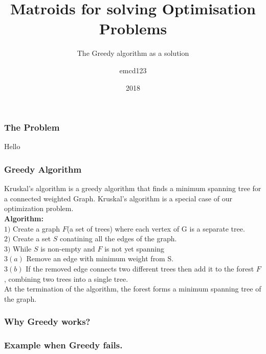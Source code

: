 \documentclass{beamer}
\title[Matroids] %
{Matroids for solving Optimisation Problems}
\subtitle{The Greedy algorithm as a solution}
\author{emcd123}
\institute{NUI Galway}
\date{2018}
\newcommand\Algorithm{%
  \textbf{Algorithm:}\\%
}
\begin{document}
 
\frame{\titlepage}
 
\begin{frame}
\frametitle{The Problem}
\begin{minipage}{.2\textwidth}
\end{minipage}
\hspace{4cm} \begin{minipage}{.2\textwidth}
Hello
\end{minipage}
\end{frame}

\begin{frame}
\frametitle{Greedy Algorithm}
Kruskal's algorithm is a greedy algorithm that finds a minimum spanning tree for a connected weighted Graph.
Kruskal's algorithm is a special case of our optimization problem.\\
\Algorithm
$1)$ Create a graph $F$(a set of trees) where each vertex of G is a separate tree.\\
$2)$ Create a set $S$ conatining all the edges of the graph.\\
$3)$ While $S$ is non-empty and $F$ is not yet spanning\\
	$3(a)$ Remove an edge with minimum weight from S.\\
	$3(b)$ If the removed edge connects two different trees then add it to the forest $F$, combining two trees into a single tree.\\
	
At the termination of the algorithm, the forest forms a minimum spanning tree of the graph.

\end{frame}

\begin{frame}
\frametitle{Why Greedy works?}

\end{frame}

\begin{frame}
\frametitle{Example when Greedy fails.}

\end{frame} 
\end{document}
